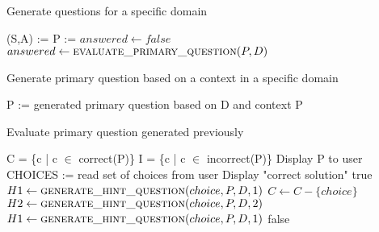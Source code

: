 \begin{algorithm}
\caption{Generate questions for a specific domain}
\label{algo:generatequestions}
\begin{algorithmic}[1]
\State (S,A) := 
\State P := 
\State $answered \gets false$
\State $answered \gets \Call{evaluate\textunderscore primary\textunderscore question}{P, D}$
\EndWhile
\EndFor
\EndFunction
\end{algorithmic}
\end{algorithm}

\begin{algorithm}
\caption{Generate primary question based on a context in a specific domain}
\label{algo:generateprimary}
\begin{algorithmic}[1]
\State P := generated primary question based on D and context
\State \Return P
\EndFunction
\end{algorithmic}
\end{algorithm}

\begin{algorithm}
\caption{Evaluate primary question generated previously}
\label{algo:evaluateprimary}
\begin{algorithmic}[1]
\Require C = \{c | c $\in$ correct(P)\}
\Require I = \{c | c $\in$ incorrect(P)\}
\State Display P to user
\State CHOICES := read set of choices from user
\State Display "correct solution"
\State \Return true
\Else
{}
\State $H1 \gets \Call{generate\textunderscore hint\textunderscore question}{choice, P, D, 1}$
\State {}
\State $C \gets C - \{choice\}$
\EndIf
\EndFor
{}
\State $H2 \gets \Call{generate\textunderscore hint\textunderscore question}{choice, P, D, 2}$
\State {}
\State $H1 \gets \Call{generate\textunderscore hint\textunderscore question}{choice, P, D, 1}$
\State {}
\EndFor
\EndIf
\State \Return false
\EndIf
\EndFunction
\end{algorithmic}
\end{algorithm}

